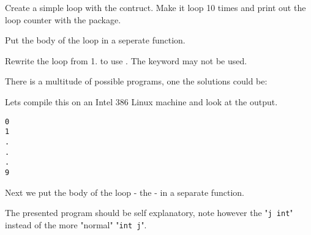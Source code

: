 \begin{Exercise}[title={For-loop},difficulty=1]

\label{ex:for-loop}
\Question \label{ex:for-loop q1} Create a simple loop with the  contruct. Make it loop
10 times and print out the loop counter with the  package.

\Question \label{ex:for-loop q2} Put the body of the loop in a seperate function.

\Question \label{ex:for-loop q3} Rewrite the loop from 1. to use . The
keyword  may not be used.
\end{Exercise}

\begin{Answer}

\Question There is a multitude of possible programs, 
one the solutions could be:

Lets compile this on an Intel 386 Linux machine and look at the
output.
\begin{alltt}
% 8g for.go && 8l -o for for.8
% ./for
0
1
.
.
.
9
\end{alltt}

\Question Next we put the body of the 
loop - the  - in a separate function.

The presented program should be self explanatory, note however the
"\lstinline{j int}" instead of the more "normal" "\lstinline{int j}".

\end{Answer}
